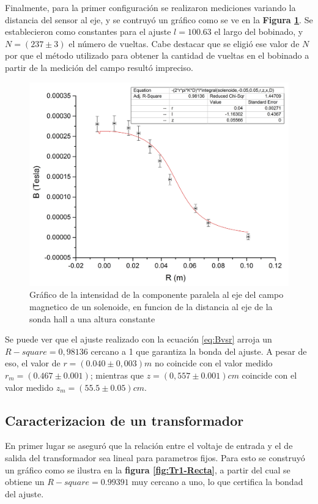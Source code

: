 \documentclass[11pt,a4paper]{article}
\begin{document}
Finalmente, para la primer configuración se realizaron mediciones variando la distancia del sensor al eje, y se contruyó un gráfico como se ve en la \textbf{Figura \ref{fig:B-vs-R}}. Se establecieron como constantes para el ajuste $l= 100.63 $ el largo del bobinado, y $N = (237 \pm 3)$ el número de vueltas. Cabe destacar que se eligió ese valor de $N$ por que el método utilizado para obtener la cantidad de vueltas en el bobinado a partir de la medición del campo resultó impreciso.

\begin{figure}[h]
	\centering
	\includegraphics[scale=0.35]{Campo-vs-Radio}
	\caption{Gráfico de la intensidad de la componente paralela al eje del campo magnetico de un solenoide, en funcion de la distancia al eje de la sonda hall a una altura constante }
   \label{fig:B-vs-R}
\end{figure}

Se puede ver que el ajuste realizado con la ecuación \eqref{eq:Bvsr} arroja un $R-square = 0,98136$ cercano a 1 que garantiza la bonda del ajuste. A pesar de eso, el valor de $r=(0.040 \pm 0,003)m$  no coincide con el valor medido $r_m=(0.467 \pm 0.001)$; mientras que $z = (0,557\pm 0.001)cm$ coincide con el valor medido $z_m = (55.5 \pm 0.05) cm$.

\subsection{Caracterizacion de un transformador}

En primer lugar se aseguró que la relación entre el voltaje de entrada y el de salida del transformador sea lineal para parametros fijos. Para esto se construyó un gráfico como se ilustra en la \textbf{figura \ref{fig:Tr1-Recta}}, a partir del cual se obtiene un $R-square = 0.99391$ muy cercano a uno, lo que certifica la bondad del ajuste.
\end{document}
